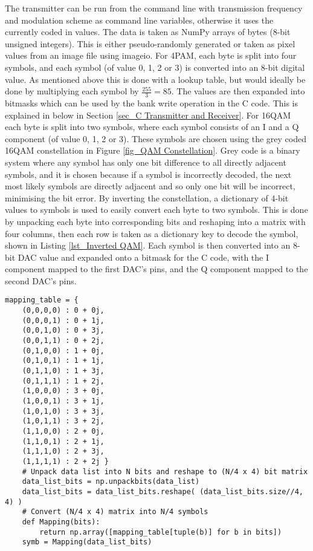 \documentclass[../main.tex]{subfiles}
\begin{document}
The transmitter can be run from the command line with transmission frequency and modulation scheme as command line variables, otherwise it uses the currently coded in values.
The data is taken as NumPy arrays of bytes (8-bit unsigned integers).
This is either pseudo-randomly generated or taken as pixel values from an image file using imageio.
For 4PAM, each byte is split into four symbols, and each symbol (of value 0, 1, 2 or 3) is converted into an 8-bit digital value.
As mentioned above this is done with a lookup table, but would ideally be done by multiplying each symbol by $\frac{255}{3} = 85$.
The values are then expanded into bitmasks which can be used by the bank write operation in the C code.
This is explained in below in Section \ref{sec_C Transmitter and Receiver}.
For 16QAM each byte is split into two symbols, where each symbol consists of an I and a Q component (of value 0, 1, 2 or 3).
These symbols are chosen using the grey coded 16QAM constellation in Figure \ref{fig_QAM Constellation}.
Grey code is a binary system where any symbol has only one bit difference to all directly adjacent symbols, and it is chosen because if a symbol is incorrectly decoded, the next most likely symbols are directly adjacent and so only one bit will be incorrect, minimising the bit error.
By inverting the constellation, a dictionary of 4-bit values to symbols is used to easily convert each byte to two symbols.
This is done by unpacking each byte into corresponding bits and reshaping into a matrix with four columns, then each row is taken as a dictionary key to decode the symbol, shown in Listing \ref{lst_Inverted QAM}.
Each symbol is then converted into an 8-bit DAC value and expanded onto a bitmask for the C code, with the I component mapped to the first DAC's pins, and the Q component mapped to the second DAC's pins.\\

\begin{lstlisting}[caption={Inverted QAM Constellation and its use to encode each byte as two symbols}, label={lst_Inverted QAM}]
	mapping_table = {
	(0,0,0,0) : 0 + 0j,
	(0,0,0,1) : 0 + 1j,
	(0,0,1,0) : 0 + 3j,
	(0,0,1,1) : 0 + 2j,
	(0,1,0,0) : 1 + 0j,
	(0,1,0,1) : 1 + 1j,
	(0,1,1,0) : 1 + 3j,
	(0,1,1,1) : 1 + 2j,
	(1,0,0,0) : 3 + 0j,
	(1,0,0,1) : 3 + 1j,
	(1,0,1,0) : 3 + 3j,
	(1,0,1,1) : 3 + 2j,
	(1,1,0,0) : 2 + 0j,
	(1,1,0,1) : 2 + 1j,
	(1,1,1,0) : 2 + 3j,
	(1,1,1,1) : 2 + 2j }
	# Unpack data list into N bits and reshape to (N/4 x 4) bit matrix
	data_list_bits = np.unpackbits(data_list)
	data_list_bits = data_list_bits.reshape( (data_list_bits.size//4, 4) )
	# Convert (N/4 x 4) matrix into N/4 symbols
	def Mapping(bits):
		return np.array([mapping_table[tuple(b)] for b in bits])
	symb = Mapping(data_list_bits)
\end{lstlisting}
\end{document}
